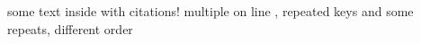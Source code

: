 \documentclass{article}
\begin{document}
some text inside \cite{arxiv:2206.06921} with citations!
multiple on line \cite{arxiv:2104.06997}, \cite{zbl:1484.28006}
repeated keys \cite{arxiv:2104.06997} and \cite{zbl:1484.28006}
\cite{zbl:0929.28007}
some repeats, different order \cite{zbl:0396.46035, zbl:07573915}
\printbibliography
\end{document}
